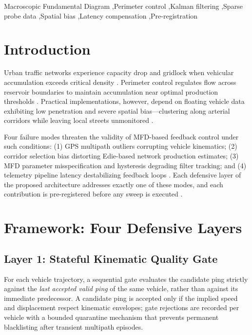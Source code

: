 \documentclass[a4paper,fleqn]{cas-dc}
\begin{document}
\begin{keywords}
Macroscopic Fundamental Diagram \sep Perimeter control \sep Kalman filtering \sep Sparse probe data \sep Spatial bias \sep Latency compensation \sep Pre-registration
\end{keywords}

\maketitle

\section{Introduction}
\label{sec:intro}
Urban traffic networks experience capacity drop and gridlock when vehicular accumulation exceeds critical density \cite{daganzo2007urban,geroliminis2008existence}. Perimeter control regulates flow across reservoir boundaries to maintain accumulation near optimal production thresholds \cite{keyvan2012exploiting,haddad2012stability,geroliminis2013optimal}. Practical implementations, however, depend on floating vehicle data exhibiting low penetration and severe spatial bias---clustering along arterial corridors while leaving local streets unmonitored \cite{ambuhl2016data,du2016deriving,nagle2014accuracy}.

Four failure modes threaten the validity of MFD-based feedback control under such conditions: (1) GPS multipath outliers corrupting vehicle kinematics; (2) corridor selection bias distorting Edie-based network production estimates; (3) MFD parameter misspecification and hysteresis degrading filter tracking; and (4) telemetry pipeline latency destabilizing feedback loops \cite{normeyrico2008dead,yuan2023computational,keyvan2014perimeter}. Each defensive layer of the proposed architecture addresses exactly one of these modes, and each contribution is pre-registered before any sweep is executed \cite{nosek2018preregistration,munafo2017manifesto}.

\section{Framework: Four Defensive Layers}
\label{sec:framework}

\subsection{Layer 1: Stateful Kinematic Quality Gate}
For each vehicle trajectory, a sequential gate evaluates the candidate ping strictly against the \emph{last accepted valid ping} of the same vehicle, rather than against its immediate predecessor. A candidate ping is accepted only if the implied speed and displacement respect kinematic envelopes; gate rejections are recorded per vehicle with a bounded quarantine mechanism that prevents permanent blacklisting after transient multipath episodes.
\end{document}
